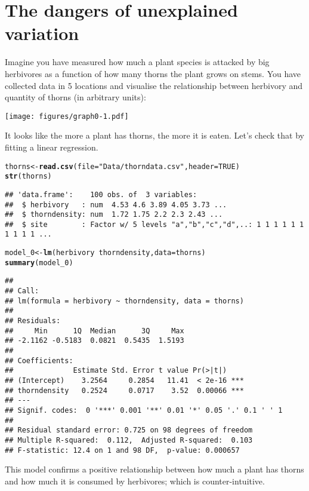 \documentclass[12pt,a4paper]{scrartcl}\usepackage[]{graphicx}\usepackage[]{color}
\makeatletter
\newcommand{\hlnum}[1]{\textcolor[rgb]{0.686,0.059,0.569}{#1}}%
\newcommand{\hlstr}[1]{\textcolor[rgb]{0.192,0.494,0.8}{#1}}%
\newcommand{\hlopt}[1]{\textcolor[rgb]{0,0,0}{#1}}%
\newcommand{\hlstd}[1]{\textcolor[rgb]{0.345,0.345,0.345}{#1}}%
\newcommand{\hlkwb}[1]{\textcolor[rgb]{0.69,0.353,0.396}{#1}}%
\newcommand{\hlkwc}[1]{\textcolor[rgb]{0.333,0.667,0.333}{#1}}%
\newcommand{\hlkwd}[1]{\textcolor[rgb]{0.737,0.353,0.396}{\textbf{#1}}}%
\newenvironment{kframe}{%
 \def\at@end@of@kframe{}%
 \ifinner\ifhmode%
  \def\at@end@of@kframe{\end{minipage}}%
  \begin{minipage}{\columnwidth}%
 \fi\fi%
 \def\FrameCommand##1{\hskip\@totalleftmargin \hskip-\fboxsep
 \colorbox{shadecolor}{##1}\hskip-\fboxsep
     \hskip-\linewidth \hskip-\@totalleftmargin \hskip\columnwidth}%
 \MakeFramed {\advance\hsize-\width
   \@totalleftmargin\z@ \linewidth\hsize
   \@setminipage}}%
 {\par\unskip\endMakeFramed%
 \at@end@of@kframe}
\newenvironment{knitrout}{}{} %
\makeatother
\begin{document}
\section{The dangers of unexplained variation}
Imagine you have measured how much a plant species is attacked by big herbivores as a function of how many thorns the plant grows on stems. You have collected data in 5 locations and visualise the relationship between herbivory and quantity of thorns (in arbitrary units):
\begin{center}
  \texttt{[image: figures/graph0-1.pdf]}
\end{center}

It looks like the more a plant has thorns, the more it is eaten. Let's check that by fitting a linear regression.

\begin{knitrout}
\color{fgcolor}\begin{kframe}
\begin{alltt}
\hlstd{thorns} \hlkwb{<-} \hlkwd{read.csv}\hlstd{(}\hlkwc{file} \hlstd{=} \hlstr{"Data/thorndata.csv"}\hlstd{,} \hlkwc{header}\hlstd{=}\hlnum{TRUE}\hlstd{)}
\hlkwd{str}\hlstd{(thorns)}
\end{alltt}
\begin{verbatim}
## 'data.frame':	100 obs. of  3 variables:
##  $ herbivory   : num  4.53 4.6 3.89 4.05 3.73 ...
##  $ thorndensity: num  1.72 1.75 2.2 2.3 2.43 ...
##  $ site        : Factor w/ 5 levels "a","b","c","d",..: 1 1 1 1 1 1 1 1 1 1 ...
\end{verbatim}
\begin{alltt}
\hlstd{model_0} \hlkwb{<-} \hlkwd{lm}\hlstd{(herbivory} \hlopt{~} \hlstd{thorndensity,} \hlkwc{data} \hlstd{= thorns)}
\hlkwd{summary}\hlstd{(model_0)}
\end{alltt}
\begin{verbatim}
## 
## Call:
## lm(formula = herbivory ~ thorndensity, data = thorns)
## 
## Residuals:
##     Min      1Q  Median      3Q     Max 
## -2.1162 -0.5183  0.0821  0.5435  1.5193 
## 
## Coefficients:
##              Estimate Std. Error t value Pr(>|t|)    
## (Intercept)    3.2564     0.2854   11.41  < 2e-16 ***
## thorndensity   0.2524     0.0717    3.52  0.00066 ***
## ---
## Signif. codes:  0 '***' 0.001 '**' 0.01 '*' 0.05 '.' 0.1 ' ' 1
## 
## Residual standard error: 0.725 on 98 degrees of freedom
## Multiple R-squared:  0.112,	Adjusted R-squared:  0.103 
## F-statistic: 12.4 on 1 and 98 DF,  p-value: 0.000657
\end{verbatim}
\end{kframe}
\end{knitrout}
This model confirms a positive relationship between how much a plant has thorns and how much it is consumed by herbivores; which is counter-intuitive.
\end{document}

